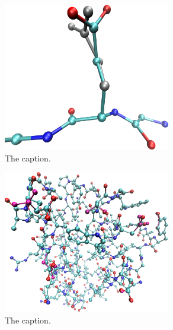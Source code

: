 \begin{figure}[h]
  \centering
  \includegraphics[width=0.65\textwidth]{figures/mutation_side_chain_images/1brs_chain_a_73.png}
  \caption{The caption.}
  \label{figure:computational_mutation_scanning/figname}
\end{figure}
\clearpage 
\begin{figure}[h]
  \centering
  \includegraphics[width=0.65\textwidth]{figures/mutation_side_chain_images/1brs_all.png}
  \caption{The caption.}
  \label{figure:computational_mutation_scanning/figname}
\end{figure}

